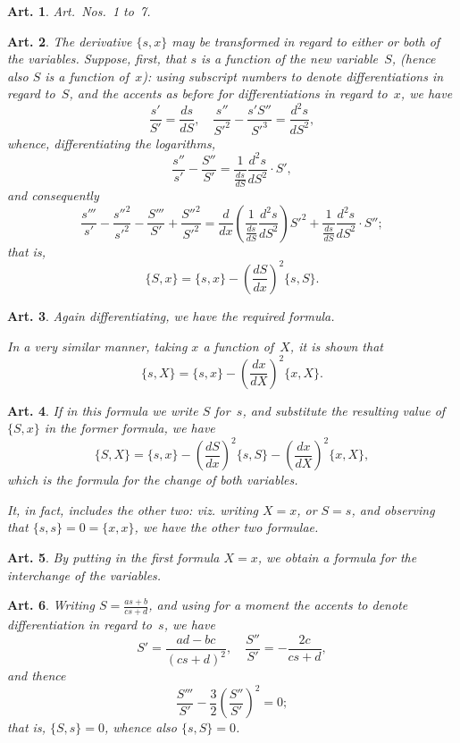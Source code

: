 \documentclass[11pt,a4paper]{article}
\theoremstyle{plain}
\newtheorem{art}{Art.}[section]
\begin{document}
\begin{art}
Art.~Nos.~1 to~7.
\end{art}

\begin{art}
The derivative $\{s, x\}$ may be transformed in regard to either or both of
the variables. Suppose, first, that $s$ is a function of the new variable~$S$,
(hence also $S$ is a function of~$x$): using subscript numbers to denote
differentiations in regard to~$S$, and the accents as before for
differentiations in regard to~$x$, we have
\[
\frac{s'}{S'} = \frac{ds}{dS}, \quad
\frac{s''}{S'^2} - \frac{s'S''}{S'^3} = \frac{d^2s}{dS^2},
\]
whence, differentiating the logarithms,
\[
\frac{s''}{s'} - \frac{S''}{S'} = \frac{1}{\frac{ds}{dS}} \frac{d^2s}{dS^2} \cdot S',
\]
and consequently
\[
\frac{s'''}{s'} - \frac{s''^2}{s'^2} - \frac{S'''}{S'} + \frac{S''^2}{S'^2}
= \frac{d}{dx} \left(\frac{1}{\frac{ds}{dS}} \frac{d^2s}{dS^2}\right) S'^2
+ \frac{1}{\frac{ds}{dS}} \frac{d^2s}{dS^2} \cdot S'';
\]
that is,
\[
\{S, x\} = \{s, x\} - \left(\frac{dS}{dx}\right)^2 \{s, S\}.
\]
\end{art}


\begin{art}
Again differentiating, we have the required formula.

In a very similar manner, taking $x$ a function of~$X$, it is shown that
\[
\{s, X\} = \{s, x\} - \left(\frac{dx}{dX}\right)^2 \{x, X\}.
\]
\end{art}

\begin{art}
If in this formula we write $S$ for~$s$, and substitute the resulting value
of $\{S, x\}$ in the former formula, we have
\[
\{S, X\} = \{s, x\} - \left(\frac{dS}{dx}\right)^2 \{s, S\}
- \left(\frac{dx}{dX}\right)^2 \{x, X\},
\]
which is the formula for the change of both variables.

It, in fact, includes the other two: viz. writing $X = x$, or $S = s$, and
observing that $\{s, s\} = 0 = \{x, x\}$, we have the other two formulae.
\end{art}

\begin{art}
By putting in the first formula $X = x$, we obtain a formula for the
interchange of the variables.
\end{art}

\begin{art}
Writing $S = \frac{as+b}{cs+d}$, and using for a moment the accents to denote
differentiation in regard to~$s$, we have
\[
S' = \frac{ad-bc}{(cs+d)^2}, \quad
\frac{S''}{S'} = -\frac{2c}{cs+d},
\]
and thence
\[
\frac{S'''}{S'} - \frac{3}{2}\left(\frac{S''}{S'}\right)^2 = 0;
\]
that is, $\{S, s\} = 0$, whence also $\{s, S\} = 0$.
\end{art}
\end{document}
